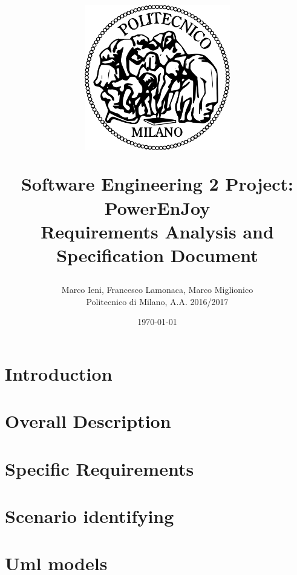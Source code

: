 \documentclass[a4paper, 12pt]{report}
\title{
	\begin{figure}[h]
		\centering
		\includegraphics{../common_resources/logo_polimi.png}
	\end{figure}
	\vspace{30px}
	Software Engineering 2 Project: PowerEnJoy \\ \vspace{1em}
	\textbf{R}equirements \textbf{A}nalysis and \textbf{S}pecification \textbf{D}ocument
}
\author{Marco Ieni, Francesco Lamonaca, Marco Miglionico\\Politecnico di Milano, A.A. 2016/2017}
\date{\today}
\begin{document}
\maketitle
\tableofcontents

\chapter{Introduction}
\label{ch:introduction}










\chapter{Overall Description}
\label{ch:overall_description}







\chapter{Specific Requirements}
\label{ch:specific_requirements}





\chapter{Scenario identifying}


\chapter{Uml models}



\end{document}
